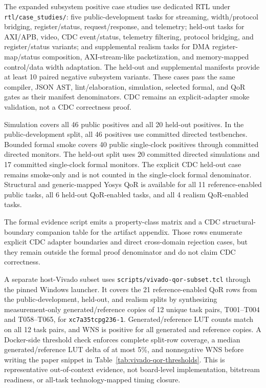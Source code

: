 The expanded subsystem positive case studies use dedicated RTL under
\texttt{rtl/case\_studies/}: five public-development tasks for streaming,
width/protocol bridging, register/status, request/response, and telemetry;
held-out tasks for AXI/APB, video, CDC event/status, telemetry filtering,
protocol bridging, and register/status variants; and supplemental realism
tasks for DMA register-map/status composition, AXI-stream-like packetization,
and memory-mapped control/data width adaptation. The held-out and supplemental
manifests provide at least 10 paired negative subsystem variants. These cases
pass the same compiler, JSON AST, lint/elaboration, simulation, selected
formal, and QoR gates as their manifest denominators. CDC remains an
explicit-adapter smoke validation, not a CDC correctness proof.

Simulation covers all 46 public positives and all 20 held-out positives. In the
public-development split, all 46 positives use committed directed testbenches.
Bounded formal smoke covers 40 public single-clock positives through committed
directed monitors. The held-out split uses 20 committed directed simulations
and 17 committed single-clock formal monitors. The explicit CDC held-out case
remains smoke-only and is not counted in the
single-clock formal denominator. Structural and generic-mapped Yosys QoR is
available for all 11 reference-enabled public tasks, all 6 held-out
QoR-enabled tasks, and all 4 realism QoR-enabled tasks.

The formal evidence script emits a property-class matrix and a CDC
structural-boundary companion table for the artifact appendix. Those rows
enumerate explicit CDC adapter boundaries and direct cross-domain rejection
cases, but they remain outside the formal proof denominator and do not claim CDC
correctness.

A separate host-Vivado subset uses \texttt{scripts/vivado-qor-subset.tcl}
through the pinned Windows launcher. It covers the 21 reference-enabled QoR rows
from the public-development, held-out, and realism splits by synthesizing
measurement-only generated/reference copies of 12 unique task pairs,
T001--T004 and T058--T065, for \texttt{xc7a35tcpg236-1}. Generated/reference
LUT counts match on all 12 task pairs, and WNS is positive for all generated
and reference copies. A Docker-side threshold check enforces complete
split-row coverage, a median generated/reference LUT delta of at most 5\%, and
nonnegative WNS before writing the paper snippet in
Table~\ref{tab:vivado-qor-thresholds}. This is representative
out-of-context evidence, not board-level implementation, bitstream readiness, or
all-task technology-mapped timing closure.

